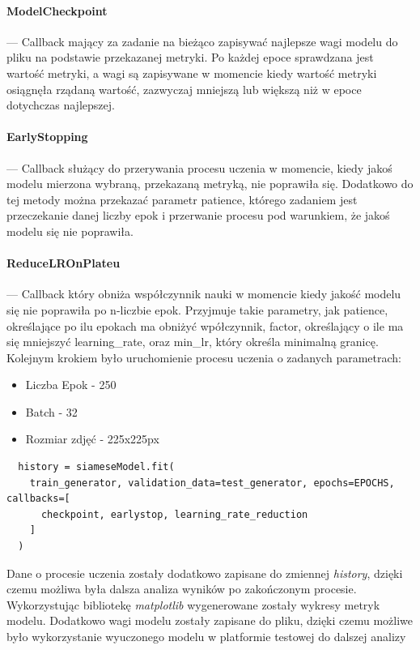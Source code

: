 \paragraph{ModelCheckpoint} --- Callback mający za zadanie na bieżąco zapisywać najlepsze wagi modelu do pliku na podstawie przekazanej metryki. Po każdej epoce sprawdzana jest wartość metryki, a wagi są zapisywane w momencie kiedy wartość metryki osiągnęła rządaną wartość, zazwyczaj mniejszą lub większą niż w epoce dotychczas najlepszej.  
\paragraph{EarlyStopping} --- Callback służący do przerywania procesu uczenia w momencie, kiedy jakoś modelu mierzona wybraną, przekazaną metryką, nie poprawiła się. Dodatkowo do tej metody można przekazać parametr patience, którego zadaniem jest przeczekanie danej liczby epok i przerwanie procesu pod warunkiem, że jakoś modelu się nie poprawiła.
\paragraph{ReduceLROnPlateu} --- Callback który obniża współczynnik nauki w momencie kiedy jakość modelu się nie poprawiła po n-liczbie epok. Przyjmuje takie parametry, jak patience, określające po ilu epokach ma obniżyć wpółczynnik, factor, określający o ile ma się mniejszyć learning\_rate, oraz min\_lr, który określa minimalną granicę.
Kolejnym krokiem było uruchomienie procesu uczenia o zadanych parametrach:
\begin{itemize}
  \item Liczba Epok - 250
  \item Batch - 32
  \item Rozmiar zdjęć - 225x225px
\end{itemize}
\begin{lstlisting}
  history = siameseModel.fit(
    train_generator, validation_data=test_generator, epochs=EPOCHS, callbacks=[
      checkpoint, earlystop, learning_rate_reduction
    ]
  )
\end{lstlisting}
Dane o procesie uczenia zostały dodatkowo zapisane do zmiennej \emph{history}, dzięki czemu możliwa była dalsza analiza wyników po zakończonym procesie. Wykorzystując bibliotekę \emph{matplotlib} wygenerowane zostały wykresy metryk modelu. Dodatkowo wagi modelu zostały zapisane do pliku, dzięki czemu możliwe było wykorzystanie wyuczonego modelu w platformie testowej do dalszej analizy

